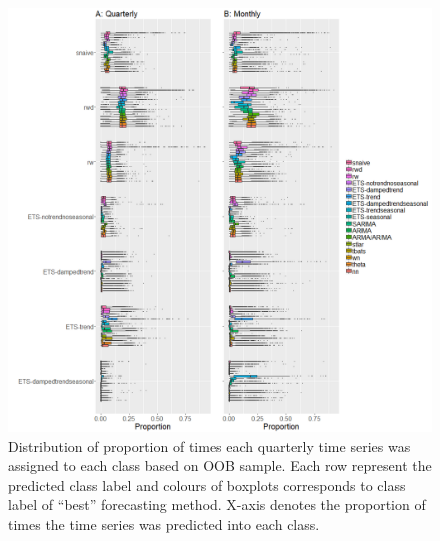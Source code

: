 \documentclass[11pt,a4paper,]{article}
\begin{document}
\begin{figure}
\centering
\includegraphics{figures/oobquarterlymonthly1-1.png}
\caption{\label{fig:oobquarterlymonthly1}Distribution of proportion of times
each quarterly time series was assigned to each class based on OOB
sample. Each row represent the predicted class label and colours of
boxplots corresponds to class label of ``best'' forecasting method.
X-axis denotes the proportion of times the time series was predicted
into each class.}
\end{figure}

\clearpage
\end{document}
